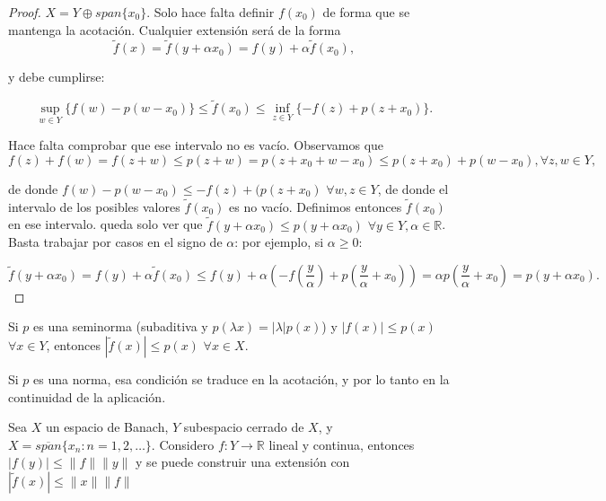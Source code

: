 \begin{proof}
  $X=Y\oplus span \{x_0\} $. Solo hace falta definir $f(x_0)$ de forma que se
  mantenga la acotación. Cualquier extensión será de la forma
  \[
  \tilde{f}(x)=\tilde{f}(y+\alpha x_0)=f(y) + \alpha\tilde{f}(x_0)
  ,\] 

  y debe cumplirse:

  \begin{equation}
    \sup_{w\in Y} \{f(w)-p(w-x_0)\} \le \tilde{f}(x_0) \le 
    \inf_{z\in Y} \{-f(z)+p(z+x_0)\} 
  .\end{equation}

  Hace falta comprobar que ese intervalo no es vacío. Observamos que
  \[
  f(z)+f(w)=f(z+w)\le p(z+w) = p(z+x_0+w-x_0)\le p(z+x_0)+p(w-x_0), \forall
  z,w\in Y
  ,\]

  de donde $f(w)-p(w-x_0)\le -f(z)+(p(z+x_0)$ $\forall w,z\in Y$, de donde el
  intervalo de los posibles valores $\tilde{f}(x_0)$ es no vacío. Definimos
  entonces $\tilde{f}(x_0)$ en ese intervalo. queda solo ver que
  $\tilde{f}(y+\alpha x_0)\le p(y+\alpha x_0)$ $\forall y\in  Y, \alpha\in
  \mathbb{R}$. Basta trabajar por casos en el signo de $\alpha$: por ejemplo, si
  $\alpha\ge 0$:

  \[
  \tilde{f}(y+\alpha x_0)=
  f(y)+\alpha \tilde{f}(x_0)\le
  f(y) + \alpha\left( -f\left( \frac{y}{\alpha} \right)+p\left( \frac{y}{\alpha} +x_0\right) \right)=
  \alpha p\left( \frac{y}{\alpha} +x_0\right)=
  p(y+\alpha x_0)
  .\] 
\end{proof}

\begin{remark}
  Si $p$ es una seminorma (subaditiva y $p(\lambda x)=|\lambda|p(x)$) y
  $|f(x)|\le p(x)$ $\forall x\in Y$, entonces $|\tilde{f}(x)|\le p(x)$ $\forall
  x\in X$.
\end{remark}

\begin{remark}
  Si $p$ es una norma, esa condición se traduce en la acotación, y por lo tanto
  en la continuidad de la aplicación.
\end{remark}

\begin{theorem}
  Sea $X$ un espacio de Banach, $Y$ subespacio cerrado de $X$, y
  $X=\overline{span} \{x_n:n=1,2,\ldots\} $. Considero $f:Y\to \mathbb{R}$ lineal
  y continua, entonces $|f(y)|\le \|f\|\|y\|$ y se puede construir una
  extensión con $|\tilde{f}(x)|\le \|x\|\|f\|$
\end{theorem}

